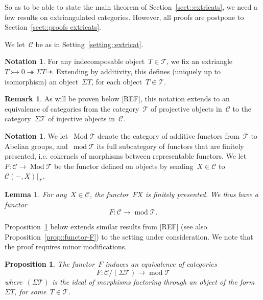 \documentclass{amsart}
\newtheorem{proposition}[theorem]{Proposition}
\newtheorem{lemma}[theorem]{Lemma}
\theoremstyle{definition}
\newtheorem{remark}[theorem]{Remark}
\newtheorem{notation}[theorem]{Notation}
\newcommand{\yann}[1]{\todo[color=red!30]{#1 --- Y.}}
\newcommand{\cat}{\mathcal{C}}
\newcommand{\susp}{\Sigma}
\newcommand{\MOD}{\operatorname{mod}}
\newcommand{\tc}{\mathcal{T}}
\newcommand{\infl}{\rightarrowtail}
\newcommand{\defl}{\twoheadrightarrow}
\newcommand{\Modt}{\operatorname{Mod}\tc}
\newcommand{\modt}{\MOD\tc}
\begin{document}
So as to be able to state the main theorem of Section~\ref{sect::extricats}, we need a few results on extriangulated categories.
However, all proofs are postpone to Section~\ref{sect::proofs extricats}.

We let~$\cat$ be as in Setting~\ref{setting::extricat}.

\begin{notation}
For any indecomposable object~$T\in\tc$, we fix an extriangle~$T\infl 0 \defl \susp T \dashrightarrow$.
Extending by additivity, this defines (uniquely up to isomorphism) an object~$\susp T$, for each object~$T\in\tc$.
\end{notation}

\begin{remark}
 As will be proven below [REF], this notation extends to an equivalence of categories from the category~$\tc$ of projective objects in~$\cat$ to the category~$\susp\tc$ of injective objects in~$\cat$.
\end{remark}


\begin{notation}
We let~$\Modt$ denote the category of additive functors from~$\tc$ to Abelian groups, and~$\modt$ its full subcategory of functors that are finitely presented, i.e. cokernels of morphisms between representable functors.
We let~$F:\cat\to\Modt$ be the functor defined on objects by sending~$X\in\cat$ to~$\cat(-,X)|_\tc$.
\end{notation}

\begin{lemma}
For any~$X\in\cat$, the functor~$FX$ is finitely presented.
We thus have a functor
\[
F:\cat\to\modt.
\]
\end{lemma}

Proposition~\ref{prop::KRextricat} below extends similar results from [REF]\yann{ref: BMR, KR ,KZ, IY...} (see also Proposition~\ref{prop::functor-F}) to the setting under consideration. We note that the proof requires minor modifications.

\begin{proposition}\label{prop::KRextricat}
The functor~$F$ induces an equivalence of categories
\[
F: \cat/(\susp\tc) \to \modt
\]
where~$(\susp\tc)$ is the ideal of morphisms factoring through an object of the form~$\susp T$, for some~$T\in\tc$.
\end{proposition}
\end{document}
